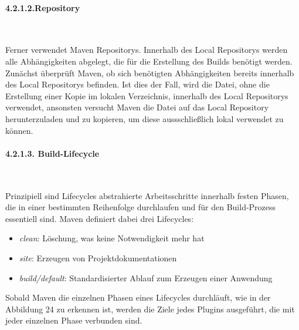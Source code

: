 \paragraph{4.2.1.2.Repository} $~$

Ferner verwendet Maven Repositorys. Innerhalb des Local Repositorys werden alle Abhängigkeiten abgelegt, die für die Erstellung des Builds benötigt werden. Zunächst überprüft Maven, ob sich benötigten Abhängigkeiten bereits innerhalb des Local Repositorys befinden. \cite[S. 45 - 47]{loukides_maven_2008} Ist dies der Fall, wird die Datei, ohne die Erstellung einer Kopie im lokalen Verzeichnis, innerhalb des Local Repositorys verwendet, ansonsten versucht Maven die Datei auf das Local Repository herunterzuladen und zu kopieren, um diese aussschließlich lokal verwendet zu können. \cite[S. 115]{spiller_maven_2011}   

\paragraph{4.2.1.3. Build-Lifecycle} $~$

Prinzipiell sind Lifecycles abstrahierte Arbeitsschritte innerhalb festen Phasen, die in einer bestimmten Reihenfolge durchlaufen und für den Build-Prozess essentiell sind. \cite[S. 57]{varanasi_introducing_2019} 
Maven definiert dabei drei Lifecycles\cite[S. 72 - 76]{spiller_maven_2011}: 

\begin{itemize}
    \item \textit{clean}: Löschung, was keine Notwendigkeit mehr hat 

    \item \textit{site}: Erzeugen von Projektdokumentationen
    
    \item \textit{build/default}: Standardisierter Ablauf zum Erzeugen einer Anwendung 

\end{itemize}

Sobald Maven die einzelnen Phasen eines Lifecycles durchläuft, wie in der Abbildung 24 zu erkennen ist, werden die Ziele jedes Plugins ausgeführt, die mit jeder einzelnen Phase verbunden sind. \cite[S. 39]{loukides_maven_2008} 

